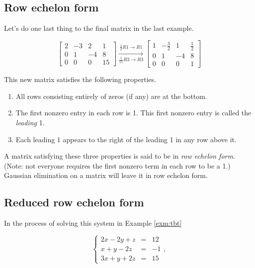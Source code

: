 \documentclass[
]{book}
\providecommand{\tightlist}{%
  \setlength{\itemsep}{0pt}\setlength{\parskip}{0pt}}
\theoremstyle{definition}
\theoremstyle{definition}
\theoremstyle{definition}
\theoremstyle{definition}
\theoremstyle{remark}
\begin{document}
\subsection*{Row echelon form}\label{row-echelon-form}

Let's do one last thing to the final matrix in the last example.

\[\left[\begin{array}{rrr|r}
2 & -3 & 2 & 1\\
0 & 1 & -4 & 8 \\
0 & 0 & 0 & 15
\end{array}\right] \xrightarrow[\frac{1}{15}R3\to R3]{\frac{1}{2}R1\to R1}
\left[\begin{array}{rrr|r}
1 & -\frac32 & 1 & \frac12 \\
0 & 1 & -4 & 8 \\
0 & 0 & 0 & 1
\end{array}\right]
\]

This new matrix satisfies the following properties.

\begin{enumerate}
\def\labelenumi{\arabic{enumi}.}
\tightlist
\item
  All rows consisting entirely of zeros (if any) are at the bottom.
\item
  The first nonzero entry in each row is 1. This first nonzero entry is called the \emph{leading} 1.
\item
  Each leading 1 appears to the right of the leading 1 in any row above it.
\end{enumerate}

A matrix satisfying these three properties is said to be in \emph{row echelon form}. (Note: not everyone requires the first nonzero term in each row to be a 1.) Gaussian elimination on a matrix will leave it in row echelon form.

\subsection*{Reduced row echelon form}\label{reduced-row-echelon-form}

In the process of solving this system in Example \ref{exm:tbt}

\begin{equation*}
    \left\{
    \begin{array}{ccl}
    2x-2y+z&=&12\\
    x+y-2z&=&-1\\
    3x+y+2z&=&15 
    \end{array} \right. ,
\end{equation*}
\end{document}
